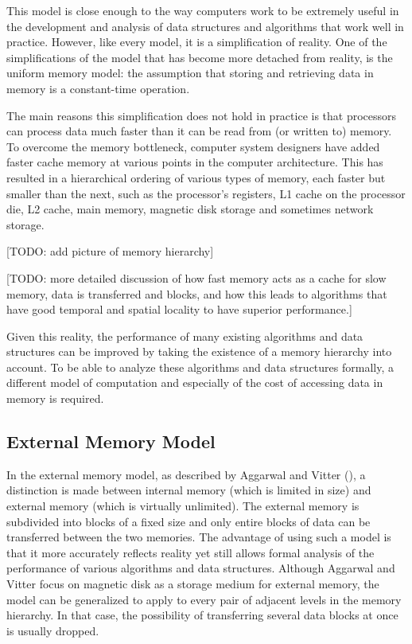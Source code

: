 \documentclass{acm_proc_article-sp}
\begin{document}
This model is close enough to the way computers work to be extremely useful in the development and analysis of data structures and algorithms that work well in practice. However, like every model, it is a simplification of reality. One of the simplifications of the model that has become more detached from reality, is the uniform memory model: the assumption that storing and retrieving data in memory is a constant-time operation.

The main reasons this simplification does not hold in practice is that processors can process data much faster than it can be read from (or written to) memory. To overcome the memory bottleneck, computer system designers have added faster cache memory at various points in the computer architecture. This has resulted in a hierarchical ordering of various types of memory, each faster but smaller than the next, such as the processor's registers, L1 cache on the processor die, L2 cache, main memory, magnetic disk storage and sometimes network storage.

[TODO: add picture of memory hierarchy]

[TODO: more detailed discussion of how fast memory acts as a cache for slow memory, data is transferred and blocks, and how this leads to algorithms that have good temporal and spatial locality to have superior performance.]

Given this reality, the performance of many existing algorithms and data structures can be improved by taking the existence of a memory hierarchy into account. To be able to analyze these algorithms and data structures formally, a different model of computation and especially of the cost of accessing data in memory is required.

\subsection{External Memory Model}
In the external memory model, as described by Aggarwal and Vitter (\cite{aggarwal1988ioc}), a distinction is made between internal memory (which is limited in size) and external memory (which is virtually unlimited). The external memory is subdivided into blocks of a fixed size and only entire blocks of data can be transferred between the two memories. The advantage of using such a model is that it more accurately reflects reality yet still allows formal analysis of the performance of various algorithms and data structures. Although Aggarwal and Vitter focus on magnetic disk as a storage medium for external memory, the model can be generalized to apply to every pair of adjacent levels in the memory hierarchy. In that case, the possibility of transferring several data blocks at once is usually dropped.
\end{document}
